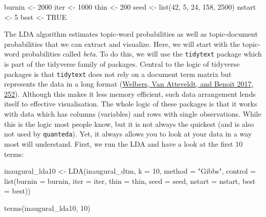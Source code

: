 \documentclass[
]{book}
\newenvironment{Shaded}{\begin{snugshade}}{\end{snugshade}}
\newcommand{\AttributeTok}[1]{\textcolor[rgb]{0.77,0.63,0.00}{#1}}
\newcommand{\ConstantTok}[1]{\textcolor[rgb]{0.00,0.00,0.00}{#1}}
\newcommand{\DecValTok}[1]{\textcolor[rgb]{0.00,0.00,0.81}{#1}}
\newcommand{\FunctionTok}[1]{\textcolor[rgb]{0.00,0.00,0.00}{#1}}
\newcommand{\NormalTok}[1]{#1}
\newcommand{\OtherTok}[1]{\textcolor[rgb]{0.56,0.35,0.01}{#1}}
\newcommand{\StringTok}[1]{\textcolor[rgb]{0.31,0.60,0.02}{#1}}
\begin{document}
\begin{Shaded}
\begin{Highlighting}[]
\NormalTok{burnin }\OtherTok{\textless{}{-}} \DecValTok{2000}
\NormalTok{iter }\OtherTok{\textless{}{-}} \DecValTok{1000}
\NormalTok{thin }\OtherTok{\textless{}{-}} \DecValTok{200}
\NormalTok{seed }\OtherTok{\textless{}{-}} \FunctionTok{list}\NormalTok{(}\DecValTok{42}\NormalTok{, }\DecValTok{5}\NormalTok{, }\DecValTok{24}\NormalTok{, }\DecValTok{158}\NormalTok{, }\DecValTok{2500}\NormalTok{)}
\NormalTok{nstart }\OtherTok{\textless{}{-}} \DecValTok{5}
\NormalTok{best }\OtherTok{\textless{}{-}} \ConstantTok{TRUE}
\end{Highlighting}
\end{Shaded}

The LDA algorithm estimates topic-word probabilities as well as topic-document probabilities that we can extract and visualize. Here, we will start with the topic-word probabilities called \emph{beta}. To do this, we will use the \texttt{tidytext} package which is part of the tidyverse family of packages. Central to the logic of tidyverse packages is that \texttt{tidytext} does not rely on a document term matrix but represents the data in a long format (\protect\hyperlink{ref-Welbers2017}{Welbers, Van Atteveldt, and Benoit 2017, 252}). Although this makes it less memory efficient, such data arrangement lends itself to effective visualisation. The whole logic of these packages is that it works with data which has columns (variables) and rows with single observations. While this is the logic most people know, but it is not always the quickest (and is also not used by \texttt{quanteda}). Yet, it always allows you to look at your data in a way most will understand. First, we run the LDA and have a look at the first 10 terms:

\begin{Shaded}
\begin{Highlighting}[]
\NormalTok{inaugural\_lda10 }\OtherTok{\textless{}{-}} \FunctionTok{LDA}\NormalTok{(inaugural\_dtm, }\AttributeTok{k =} \DecValTok{10}\NormalTok{, }\AttributeTok{method =} \StringTok{"Gibbs"}\NormalTok{,}
    \AttributeTok{control =} \FunctionTok{list}\NormalTok{(}\AttributeTok{burnin =}\NormalTok{ burnin, }\AttributeTok{iter =}\NormalTok{ iter, }\AttributeTok{thin =}\NormalTok{ thin,}
        \AttributeTok{seed =}\NormalTok{ seed, }\AttributeTok{nstart =}\NormalTok{ nstart, }\AttributeTok{best =}\NormalTok{ best))}

\FunctionTok{terms}\NormalTok{(inaugural\_lda10, }\DecValTok{10}\NormalTok{)}
\end{Highlighting}
\end{Shaded}
\end{document}
